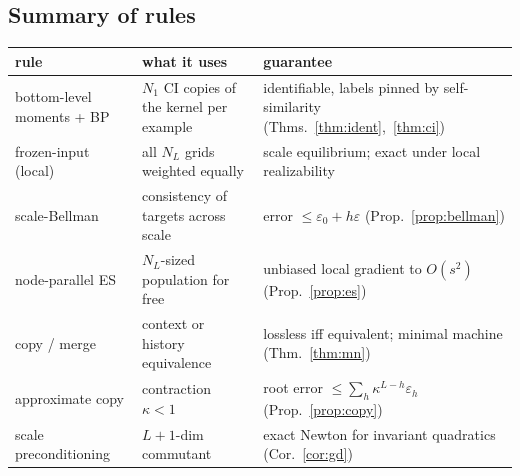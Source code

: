 \documentclass[11pt]{article}
\theoremstyle{definition}
\newcommand{\eps}{\varepsilon}
\newcommand{\Nint}{N_{L}}
\begin{document}
\subsection{Summary of rules}
\begin{center}\begin{tabular}{p{3.6cm}p{5.2cm}p{5.4cm}}\toprule
rule & what it uses & guarantee\\\midrule
bottom-level moments + BP & $N_1$ CI copies of the kernel per example & identifiable, labels pinned by self-similarity (Thms.~\ref{thm:ident},~\ref{thm:ci})\\
frozen-input (local) & all $\Nint$ grids weighted equally & scale equilibrium; exact under local realizability\\
scale-Bellman & consistency of targets across scale & error $\le\eps_0+h\eps$ (Prop.~\ref{prop:bellman})\\
node-parallel ES & $\Nint$-sized population for free & unbiased local gradient to $O(s^2)$ (Prop.~\ref{prop:es})\\
copy / merge & context or history equivalence & lossless iff equivalent; minimal machine (Thm.~\ref{thm:mn})\\
approximate copy & contraction $\kappa<1$ & root error $\le\sum_h\kappa^{L-h}\eps_h$ (Prop.~\ref{prop:copy})\\
scale preconditioning & $L{+}1$-dim commutant & exact Newton for invariant quadratics (Cor.~\ref{cor:gd})\\
\bottomrule\end{tabular}\end{center}

\end{document}
